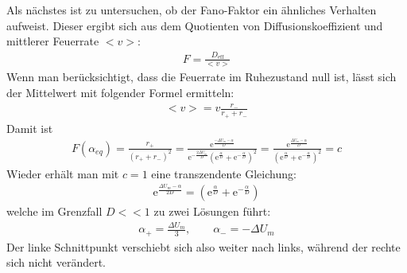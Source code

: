 \documentclass[12pt,a4paper]{article}
\begin{document}
Als nächstes ist zu untersuchen, ob der Fano-Faktor ein ähnliches Verhalten aufweist. Dieser ergibt sich aus dem Quotienten von Diffusionskoeffizient und mittlerer Feuerrate $<v>$:
\begin{align*}
F=\frac{D_{\text{eff}}}{<v>}
\end{align*}
Wenn man berücksichtigt, dass die Feuerrate im Ruhezustand null ist, lässt sich der Mittelwert mit folgender Formel ermitteln:
\begin{align*}
<v>=v\frac{r_-}{r_++r_-}
\end{align*}
Damit ist
\begin{align*}
F(\alpha_{eq})=\frac{r_+}{(r_++r_-)^2}=\frac{\text{e}^{\frac{-\Delta U_m-\alpha}{D}}}{\text{e}^{-\frac{2\Delta U_m}{D}}\left(\text{e}^{\frac{\alpha}{D}}+\text{e}^{-\frac{\alpha}{D}}\right)^2}=\frac{\text{e}^{\frac{\Delta U_m-\alpha}{D}}}{\left(\text{e}^{\frac{\alpha}{D}}+\text{e}^{-\frac{\alpha}{D}}\right)^2}=c
\end{align*}
Wieder erhält man mit $c=1$ eine transzendente Gleichung:
\begin{align*}
\text{e}^{\frac{\Delta U_m-\alpha}{2D}}=\left(\text{e}^{\frac{\alpha}{D}}+\text{e}^{-\frac{\alpha}{D}}\right)
\end{align*}
welche im Grenzfall $D<<1$ zu zwei Lösungen führt:
\begin{align*}
\alpha_+=\frac{\Delta U_m}{3}, \qquad \alpha_-=-\Delta U_m
\end{align*}
Der linke Schnittpunkt verschiebt sich also weiter nach links, während der rechte sich nicht verändert.
\end{document}
